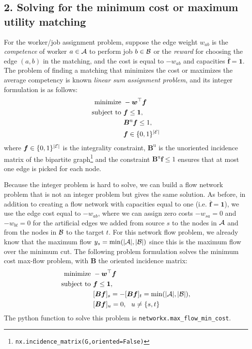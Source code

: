 \documentclass[11pt]{exam}
\begin{document}
\subsection*{2. Solving for the minimum cost or maximum utility matching}
For the worker/job assignment problem, suppose the edge weight $w_{ab}$ is the {\it competence} of worker $a \in \cal A$ to perform job $b \in \cal B$ or the {\it reward} for choosing the edge $(a,b)$ in the matching, and the cost is equal to $-w_{ab}$ and capacities $\overline{\bm f}=\bm 1$. The problem of finding a matching that minimizes the cost or maximizes the average competency is known {\it linear sum assignment problem}, and its integer formulation is as follows:
\begin{align}
\text{minimize} &~-\bm w^\top \bm f\\
\mbox{subject to}&~\bm f\leq \bm 1,\\ 
&~\bm B^{\text{u}}\bm f\leq 1,\\  
&~\bm f \in \{0,1\}^{|\cal E|}
\end{align}
where $\bm f \in \{0,1\}^{|\cal E|}$ is the integrality constraint, $\bm B^{\text{u}}$ is the unoriented incidence matrix of the bipartite graph\footnote{\tt nx.incidence\_matrix(G,oriented=False)} and the constraint $\bm B^{\text{u}}\bm f\leq 1$ ensures that at most one edge is picked for each node. 

Because the integer problem is hard to solve, we can build a flow network problem that is not an integer problem but gives the same solution. As before, in addition to creating a flow network with capacities equal to one (i.e. $\overline{\bm f}=\bm 1$), we use the edge cost equal to $-w_{ab}$, where we can assign zero costs $-w_{sa}=0$ and $-w_{bt}=0$ for the artificial edges we added from source $s$ to the nodes in ${\cal A}$ and from the nodes in ${\cal B}$ to the target $t$. For this network flow problem, we already know that the maximum flow $y_s=\min(|{\cal A}|, |{\cal B}|)$ since this is the maximum flow over the minimum cut. The following problem formulation solves the minimum cost max-flow problem, with $\bm B$ the oriented incidence matrix:
   \begin{align}
      \text{minimize} &~-\bm w^\top \bm f\\
      \mbox{subject to}&~\bm f\leq \bm 1,\\
      &~[\bm B\bm f]_s=-[\bm B\bm f]_t=\min(|{\cal A}|, |{\cal B}|),\\
      &~[\bm B\bm f]_u=0,~~u\neq \{s,t\}  
    \end{align}
The python function to solve this problem is \texttt{networkx.max\_flow\_min\_cost}.
\end{document}
